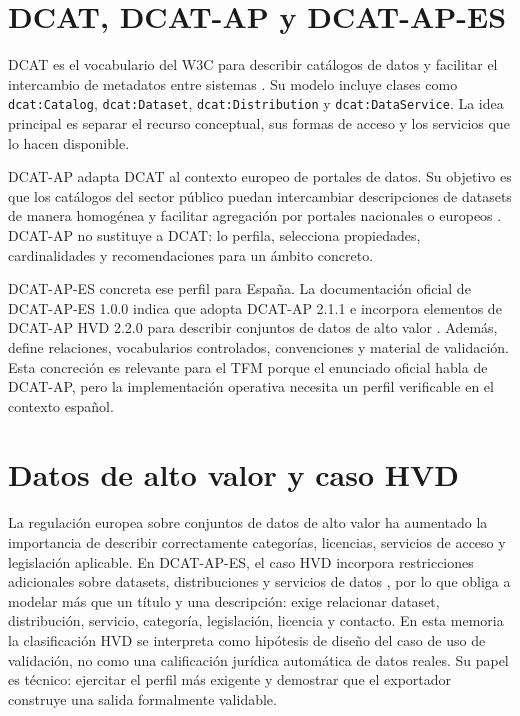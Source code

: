 \section{DCAT, DCAT-AP y DCAT-AP-ES}

DCAT es el vocabulario del W3C para describir catálogos de datos y facilitar el intercambio de metadatos entre sistemas \cite{w3cDcat3}. Su modelo incluye clases como \texttt{dcat:Catalog}, \texttt{dcat:Dataset}, \texttt{dcat:Distribution} y \texttt{dcat:DataService}. La idea principal es separar el recurso conceptual, sus formas de acceso y los servicios que lo hacen disponible.

DCAT-AP adapta DCAT al contexto europeo de portales de datos. Su objetivo es que los catálogos del sector público puedan intercambiar descripciones de datasets de manera homogénea y facilitar agregación por portales nacionales o europeos \cite{europeDcatAp}. DCAT-AP no sustituye a DCAT: lo perfila, selecciona propiedades, cardinalidades y recomendaciones para un ámbito concreto.

DCAT-AP-ES concreta ese perfil para España. La documentación oficial de DCAT-AP-ES 1.0.0 indica que adopta DCAT-AP 2.1.1 e incorpora elementos de DCAT-AP HVD 2.2.0 para describir conjuntos de datos de alto valor \cite{datosGobDcatApEs2025}. Además, define relaciones, vocabularios controlados, convenciones y material de validación. Esta concreción es relevante para el TFM porque el enunciado oficial habla de DCAT-AP, pero la implementación operativa necesita un perfil verificable en el contexto español.

\section{Datos de alto valor y caso HVD}

La regulación europea sobre conjuntos de datos de alto valor ha aumentado la importancia de describir correctamente categorías, licencias, servicios de acceso y legislación aplicable. En DCAT-AP-ES, el caso HVD incorpora restricciones adicionales sobre datasets, distribuciones y servicios de datos \cite{datosGobValidacionDcatApEs2025}, por lo que obliga a modelar más que un título y una descripción: exige relacionar dataset, distribución, servicio, categoría, legislación, licencia y contacto. En esta memoria la clasificación HVD se interpreta como hipótesis de diseño del caso de uso de validación, no como una calificación jurídica automática de datos reales. Su papel es técnico: ejercitar el perfil más exigente y demostrar que el exportador construye una salida formalmente validable.

